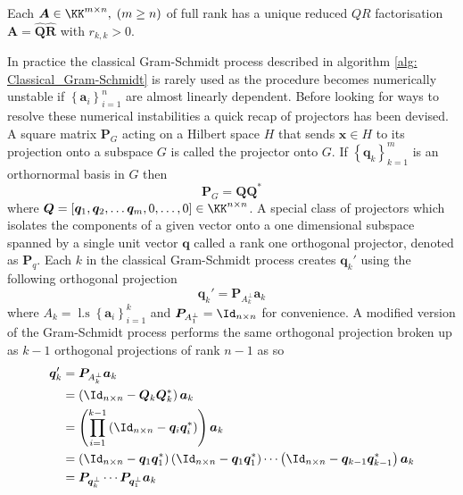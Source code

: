 \begin{thm} \label{theorem: QR_full_rank_unique}
    Each $\bm{A} \in \KK^{m \times n}, \; (m \geq n)$ of full rank has a unique reduced $QR$ factorisation $\bm{A} = \hat{\bm{Q}} \hat{\bm{R}}$ with $r_{k,k} > 0$.
    \cite{TrefethenLloydN.LloydNicholas1997Nla/}
\end{thm}

In practice the classical Gram-Schmidt process described in algorithm \ref{alg: Classical_Gram-Schmidt} is rarely used as the procedure becomes numerically unstable if $\left\{ \bm{a}_i \right\}_{i=1}^{n}$ are almost linearly dependent. Before looking for ways to resolve these numerical instabilities a quick recap of projectors has been devised. A square matrix $\bm{P}_{G}$ acting on a Hilbert space $H$ that sends $\bm{x} \in H$ to its projection onto a subspace $G$ is called the projector onto $G$. If $\left\{ \bm{q}_k \right\}_{k=1}^{m}$ is an orthornormal basis in $G$ then
\[
    \bm{P}_{G} = \bm{Q} \bm{Q}^{\ast}
\]
where $\bm{Q} = \left[ \bm{q}_1 , \bm{q}_2 , \ldots \bm{q}_m, 0 , \ldots , 0 \right] \in \KK^{n \times n}$. A special class of projectors which isolates the components of a given vector onto a one dimensional subspace spanned by a single unit vector $\bm{q}$ called a rank one orthogonal projector, denoted as $\bm{P}_{q}$. Each $k$ in the classical Gram-Schmidt process creates $\bm{q}_k'$ using the following orthogonal projection
\begin{equation}\label{eq: classical_GS_proj}
    \bm{q}_k' = \bm{P}_{A_{k}^{\perp}} \bm{a}_k
\end{equation}
where $A_k = \operatorname{l.s} \left\{ \bm{a}_i \right\}_{i=1}^{k}$ and $\bm{P}_{A_{1}^{\perp}} = \Id_{n \times n}$ for convenience. A modified version of the Gram-Schmidt process performs the same orthogonal projection broken up as $k-1$ orthogonal projections of rank $n-1$ as so
\begin{align*}
    \bm{q}_k' & = \bm{P}_{A_{k}^{\perp}} \bm{a}_k                                                                                                                                                                          \\
              & = \left( \Id_{n \times n} - \bm{Q}_{k} \bm{Q}_{k}^{\ast} \right) \bm{a}_k                                                                                                                                  \\
              & = \left( \prod_{i=1}^{k-1} \left( \Id_{n \times n} - \bm{q}_i \bm{q}_i^{\ast} \right) \right)\bm{a}_k                                                                                                      \\
              & = \left( \Id_{n \times n} - \bm{q}_1 \bm{q}_1^{\ast} \right) \left( \Id_{n \times n} - \bm{q}_1 \bm{q}_1^{\ast} \right) \cdots \left( \Id_{n \times n} - \bm{q}_{k-1} \bm{q}_{k-1}^{\ast} \right) \bm{a}_k \\
              & = \bm{P}_{\bm{q}_{k}^{\perp}} \cdots \bm{P}_{\bm{q}_{1}^{\perp}} \bm{a}_k
\end{align*}

